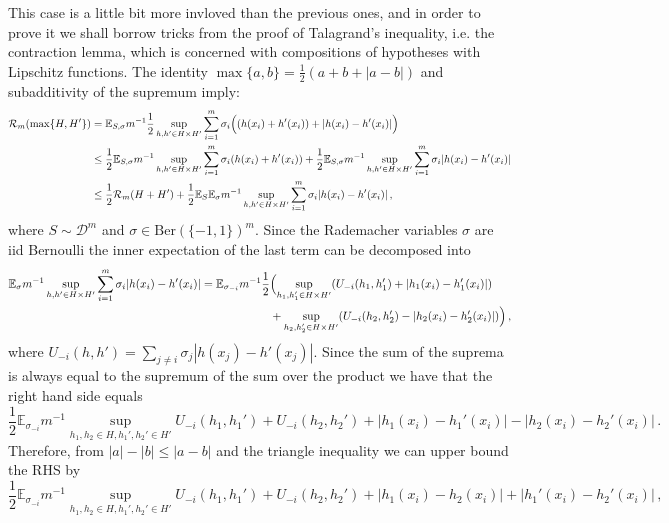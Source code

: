 \documentclass[a4paper]{article}
\newcommand{\ex}{\mathbb{E}}
\begin{document}
This case is a little bit more invloved than the previous ones, and in order to
prove it we shall borrow tricks from the proof of Talagrand's inequality, i.e. the
contraction lemma, which is concerned with compositions of hypotheses with Lipschitz
functions. The identity $\max\{a, b\} = \frac{1}{2}(a+b+|a-b|)$ and subadditivity
of the supremum imply:
\begin{align*}
  \mathcal{R}_m(\max\{H,H'\})
    &= \ex_{S, \sigma} m^{-1} \frac{1}{2} \sup_{h, h'\in H\times H'}
            \sum_{i=1}^m \sigma_i \Bigl((h(x_i) + h'(x_i)) + |h(x_i) - h'(x_i)|\Bigr)\\
    &\leq \frac{1}{2} \ex_{S, \sigma}
            m^{-1} \sup_{h, h'\in H\times H'} \sum_{i=1}^m \sigma_i (h(x_i) + h'(x_i))
          + \frac{1}{2} \ex_{S, \sigma}
            m^{-1} \sup_{h, h'\in H\times H'} \sum_{i=1}^m \sigma_i |h(x_i) - h'(x_i)| \\
    &\leq \frac{1}{2} \mathcal{R}_m(H+H')
          + \frac{1}{2} \ex_S \ex_\sigma
            m^{-1} \sup_{h, h'\in H\times H'} \sum_{i=1}^m \sigma_i |h(x_i) - h'(x_i)| \,,
\end{align*}
where $S \sim \mathcal{D}^m$ and $\sigma\in \text{Ber}(\{-1, 1\})^m$. Since the
Rademacher variables $\sigma$ are iid Bernoulli the inner expectation of the last
term can be decomposed into
\begin{align*}
  \ex_\sigma m^{-1} \sup_{h, h'\in H\times H'}
      \sum_{i=1}^m \sigma_i |h(x_i) - h'(x_i)|
    = \ex_{\sigma_{-i}} m^{-1} \frac{1}{2} &\Bigl(
      \sup_{h_1, h_1'\in H\times H'}
        (U_{-i}(h_1,h_1') + |h_1(x_i) - h_1'(x_i)|) \\
      &+ \sup_{h_2, h_2'\in H\times H'}
        (U_{-i}(h_2,h_2') - |h_2(x_i) - h_2'(x_i)|) \Bigr) \,,
\end{align*}
where $U_{-i}(h,h') = \sum_{j\neq i} \sigma_j |h(x_j) - h'(x_j)|$. Since the sum
of the suprema is always equal to the supremum of the sum over the product we have
that the right hand side equals
\begin{equation*}
  \frac{1}{2} \ex_{\sigma_{-i}} m^{-1}
      \sup_{h_1, h_2\in H, h_1', h_2'\in H'}
        U_{-i}(h_1,h_1') + U_{-i}(h_2,h_2')
        + |h_1(x_i) - h_1'(x_i)| - |h_2(x_i) - h_2'(x_i)| \,.
\end{equation*}
Therefore, from $|a|-|b|\leq |a-b|$ and the triangle inequality we can upper bound
the RHS by
\begin{equation*}
  \frac{1}{2} \ex_{\sigma_{-i}} m^{-1}
      \sup_{h_1, h_2\in H, h_1', h_2'\in H'}
        U_{-i}(h_1,h_1') + U_{-i}(h_2,h_2')
        + |h_1(x_i) - h_2(x_i)| + |h_1'(x_i) - h_2'(x_i)| \,,
\end{equation*}
\end{document}
